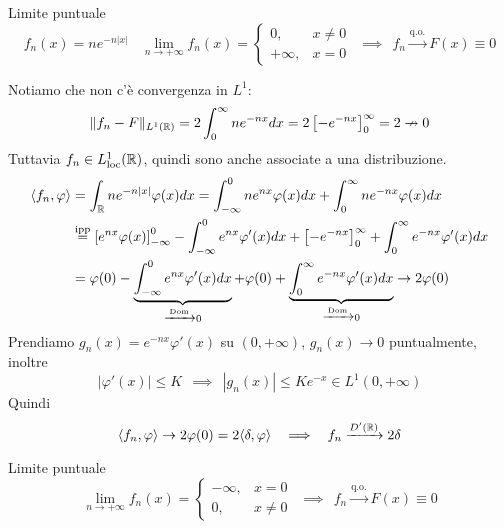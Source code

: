 Limite puntuale
\begin{equation*}
f_{n} (x)=ne^{-n|x|} \ \ \ \ \lim\limits _{n\rightarrow +\infty } f_{n}( x) =\begin{cases}
0, & x\neq 0\\
+\infty , & x=0
\end{cases} \ \ \implies \ \ f_{n}\xrightarrow{\text{q.o.}} F( x) \equiv 0
\end{equation*}

Notiamo che non c'è convergenza in $L^{1}$:
\begin{equation*}
\Vert f_{n} -F\Vert _{L^{1}(\mathbb{R} )} =2\int ^{\infty }_{0} ne^{-nx} dx=2\left[ -e^{-nx}\right]^{\infty }_{0} =2\nrightarrow 0
\end{equation*}
Tuttavia $f_{n} \in L^{1}_{\mathrm{loc}}(\mathbb{R} )$, quindi sono anche associate a una distribuzione.
\begin{equation*}
\begin{aligned}
\langle f_{n} ,\varphi \rangle  & =\int _{\mathbb{R} } ne^{-n| x| } \varphi ( x) dx=\int ^{0}_{-\infty } ne^{nx} \varphi ( x) dx+\int ^{\infty }_{0} ne^{-nx} \varphi ( x) dx\\
 & \overset{\text{ipp}}{=}\left[ e^{nx} \varphi ( x)\right]^{0}_{-\infty } -\int ^{0}_{-\infty } e^{nx} \varphi '( x) dx+\left[ -e^{-nx}\right]^{\infty }_{0} +\int ^{\infty }_{0} e^{-nx} \varphi '( x) dx\\
 & =\varphi ( 0) -\underbrace{\int ^{0}_{-\infty } e^{nx} \varphi '( x) dx}_{\xrightarrow{\text{Dom}} 0} +\varphi ( 0) +\underbrace{\int ^{\infty }_{0} e^{-nx} \varphi '( x) dx}_{\xrightarrow{\text{Dom}} 0}\rightarrow 2\varphi ( 0)
\end{aligned}
\end{equation*}
Prendiamo $g_{n}( x) =e^{-nx} \varphi '( x)$ su $( 0,+\infty )$, $g_{n}( x)\rightarrow 0$ puntualmente, inoltre
\begin{equation*}
| \varphi '( x)| \leqslant K\ \ \implies \ \ | g_{n}( x)| \leqslant Ke^{-x} \in L^{1}( 0,+\infty )
\end{equation*}
Quindi
\begin{equation*}
\langle f_{n} ,\varphi \rangle \rightarrow 2\varphi ( 0) =2\langle \delta ,\varphi \rangle \ \ \implies \ \ f_{n}\xrightarrow{D'(\mathbb{R} )} 2\delta 
\end{equation*}
\Soluzione

Limite puntuale
\begin{equation*}
\lim\limits _{n\rightarrow +\infty } f_{n}( x) =\begin{cases}
-\infty , & x=0\\
0, & x\neq 0
\end{cases} \ \ \implies \ \ f_{n}\xrightarrow{\text{q.o.}} F( x) \equiv 0
\end{equation*}

